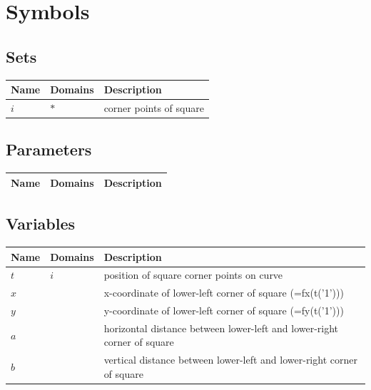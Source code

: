 \documentclass[11pt]{article}
\begin{document}
\section*{Symbols}


\subsection*{Sets}
\begin{tabularx}{\textwidth}{| l | l | X |}
\hline
\textbf{Name} & \textbf{Domains} & \textbf{Description}\\
\hline
\endhead

$i$ & $*$ & corner points of square\\
\hline
\end{tabularx}
\subsection*{Parameters}
\begin{tabularx}{\textwidth}{| l | l | X |}
\hline
\textbf{Name} & \textbf{Domains} & \textbf{Description}\\
\hline
\endhead

\hline
\end{tabularx}
\subsection*{Variables}
\begin{tabularx}{\textwidth}{| l | l | X |}
\hline
\textbf{Name} & \textbf{Domains} & \textbf{Description}\\
\hline
\endhead

$t$ & $i$ & position of square corner points on curve\\
$x$ &  & x-coordinate of lower-left corner of square (=fx(t('1')))\\
$y$ &  & y-coordinate of lower-left corner of square (=fy(t('1')))\\
$a$ &  & horizontal distance between lower-left and lower-right corner of square\\
$b$ &  & vertical distance between lower-left and lower-right corner of square\\
\hline
\end{tabularx}
\end{document}
